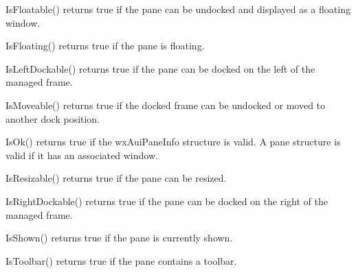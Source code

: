 IsFloatable() returns true if the pane can be undocked and displayed as a floating window.

\label{wxauipaneinfoisfloating}


IsFloating() returns true if the pane is floating.

\label{wxauipaneinfoisleftdockable}


IsLeftDockable() returns true if the pane can be docked on the left of the managed frame.

\label{wxauipaneinfoismovable}


IsMoveable() returns true if the docked frame can be undocked or moved to another dock position.

\label{wxauipaneinfoisok}


IsOk() returns true if the wxAuiPaneInfo structure is valid.  A pane structure is valid if it has an associated window.

\label{wxauipaneinfoisresizable}


IsResizable() returns true if the pane can be resized.

\label{wxauipaneinfoisrightdockable}


IsRightDockable() returns true if the pane can be docked on the right of the managed frame.

\label{wxauipaneinfoisshown}


IsShown() returns true if the pane is currently shown.

\label{wxauipaneinfoistoolbar}


IsToolbar() returns true if the pane contains a toolbar.

